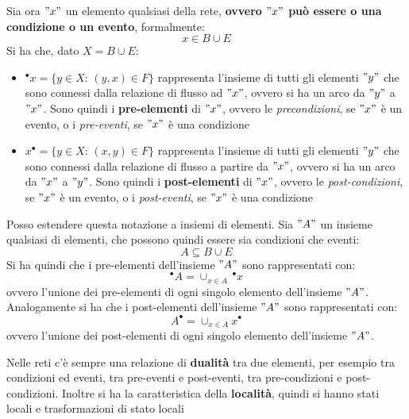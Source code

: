 \begin{definizione}
\begin{definizione}
  Sia ora $"x"$ un elemento qualsiasi della rete, \textbf{ovvero $"x"$ può essere o una
  condizione o un evento}, formalmente:
  \[x\in B\cup E\]
  Si ha che, dato $X=B\cup E$:
  \begin{itemize}
    \item $^\bullet x=\{y\in X:\,(y, x)\in F\}$ rappresenta l'insieme di tutti gli
    elementi $"y"$ che sono connessi dalla relazione di flusso ad $"x"$, ovvero si
    ha un arco da $"y"$ a $"x"$. Sono quindi i \textbf{pre-elementi} di $"x"$, ovvero
    le \textit{precondizioni}, se $"x"$ è un evento, o i \textit{pre-eventi}, se
    $"x"$ è una condizione
    \item $x^\bullet=\{y\in X:\,(x, y)\in F\}$ rappresenta l'insieme di tutti gli
    elementi $"y"$ che sono connessi dalla relazione di flusso a partire da $"x"$,
    ovvero si ha un arco da $"x"$ a $"y"$. Sono quindi i \textbf{post-elementi} di
    $"x"$, ovvero le \textit{post-condizioni}, se $"x"$ è un evento, o i
    \textit{post-eventi}, se $"x"$ è una condizione
  \end{itemize}
  
  \end{definizione} \vspace{5mm} %
  \begin{corollario}
     Posso estendere questa notazione a insiemi di elementi. Sia $"A"$ un insieme
  qualsiasi di elementi, che possono quindi essere sia condizioni che eventi:
  \[A\subseteq B\cup E\]
  Si ha quindi che i pre-elementi dell'insieme $"A"$ sono rappresentati con:
  \[^\bullet A=\cup_{x\in A}\, ^\bullet x\]
  ovvero l'unione dei pre-elementi di ogni singolo elemento dell'insieme $"A"$.\\
  Analogamente si ha che i post-elementi dell'insieme $"A"$ sono rappresentati
  con: 
  \[A^\bullet=\cup_{x\in A} x^\bullet\]
  ovvero l'unione dei post-elementi di ogni singolo elemento dell'insieme $"A"$.
    \end{corollario}
  \begin{nota}
  Nelle reti c'è sempre una relazione di \textbf{dualità} tra due
    elementi, per esempio tra condizioni ed eventi, tra pre-eventi e
    post-eventi, tra pre-condizioni e post-condizioni. Inoltre si ha la
    caratteristica della \textbf{località}, quindi si hanno stati locali e
    trasformazioni di stato locali
  \end{nota}
\end{definizione} \vspace{5mm} %
